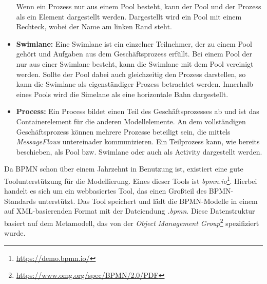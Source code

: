\begin{itemize}
    Wenn ein Prozess nur aus einem Pool besteht, kann der Pool und der Prozess als ein Element dargestellt werden.
    Dargestellt wird ein Pool mit einem Rechteck, wobei der Name am linken Rand steht.
    \item \textbf{Swimlane:}
    Eine Swimlane ist ein einzelner Teilnehmer, der zu einem Pool gehört und Aufgaben aus dem Geschäftsprozess erfüllt.
    Bei einem Pool der nur aus einer Swimlane besteht, kann die Swimlane mit dem Pool vereinigt werden.
    Sollte der Pool dabei auch gleichzeitig den Prozess darstellen, so kann die Swimlane als eigenständiger Prozess betrachtet werden.
    Innerhalb eines Pools wird die Simelane als eine horizontale Bahn dargestellt.
    \item \textbf{Process:}
    Ein Process bildet einen Teil des Geschäftsprozesses ab und ist das Containerelement für die anderen Modellelemente.
    An dem vollständigen Geschäftsprozess können mehrere Prozesse beteiligt sein, die mittels \emph{MessageFlows} untereinader kommunizieren.
    Ein Teilprozess kann, wie bereits beschieben, als Pool bzw. Swimlane oder auch als Activity dargestellt werden.
\end{itemize}

Da BPMN schon über einem Jahrzehnt in Benutzung ist, existiert eine gute Toolunterstützung für die Modellierung.
Eines dieser Tools ist \emph{bpmn.io}\footnote{\url{https://demo.bpmn.io/}}.
Hierbei handelt es sich um ein webbasiertes Tool, das einen Großteil des BPMN-Standards unterstützt.
Das Tool speichert und lädt die BPMN-Modelle in einem auf XML-basierenden Format mit der Dateiendung \emph{.bpmn}.
Diese Datenstruktur basiert auf dem Metamodell, das von der \emph{Object Management Group}\footnote{\url{https://www.omg.org/spec/BPMN/2.0/PDF}} spezifiziert wurde.

